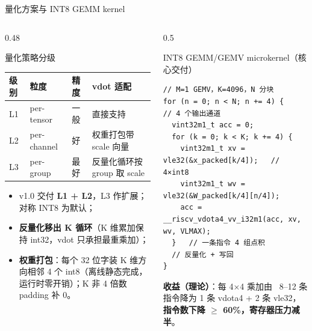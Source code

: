 \documentclass[aspectratio=169]{beamer}
\newcommand{\smalltable}[1]{\par\centering\scriptsize #1\par}
\begin{document}
\begin{frame}[fragile]{量化方案与 INT8 GEMM kernel}
\begin{columns}[T]
\begin{column}{0.48\textwidth}
\begin{block}{量化策略分级}
\smalltable{%
\begin{tabular}{@{}llll@{}}
\toprule
级别 & 粒度 & 精度 & vdot 适配 \\
\midrule
L1 & per-tensor & 一般 & 直接支持 \\
L2 & per-channel & 好 & 权重打包带 scale 向量 \\
L3 & per-group & 最好 & 反量化循环按 group 取 scale \\
\bottomrule
\end{tabular}}
\end{block}
\begin{itemize}
  \item v1.0 交付 \textbf{L1 + L2}，L3 作扩展；对称 INT8 为默认；
  \item \textbf{反量化移出 K 循环}（K 维累加保持 int32，vdot 只承担最重乘加）；
  \item \textbf{权重打包}：每个 32 位字装 K 维方向相邻 4 个 int8（离线静态完成，运行时零开销）；K 非 4 倍数 padding 补 0。
\end{itemize}
\end{column}
\begin{column}{0.5\textwidth}
\begin{block}{INT8 GEMM/GEMV microkernel（核心交付）}
\scriptsize
\begin{verbatim}
// M=1 GEMV，K=4096，N 分块
for (n = 0; n < N; n += 4) {      // 4 个输出通道
  vint32m1_t acc = 0;
  for (k = 0; k < K; k += 4) {
    vint32m1_t xv = vle32(&x_packed[k/4]);   // 4×int8
    vint32m1_t wv = vle32(&W_packed[k/4][n/4]);
    acc = __riscv_vdota4_vv_i32m1(acc, xv, wv, VLMAX);
  }   // 一条指令 4 组点积
  // 反量化 + 写回
}
\end{verbatim}
\end{block}
\textbf{收益（理论）}：每 4×4 乘加由 ~8–12 条指令降为 1 条 vdota4 + 2 条 vle32，\textbf{指令数下降 $\ge$ 60\%，寄存器压力减半}。
\end{column}
\end{columns}
\end{frame}
\end{document}
